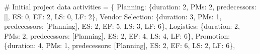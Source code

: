 \documentclass[
  letterpaper,
  DIV=11,
  numbers=noendperiod]{scrreprt}
\newenvironment{Shaded}{\begin{snugshade}}{\end{snugshade}}
\newcommand{\CommentTok}[1]{\textcolor[rgb]{0.37,0.37,0.37}{#1}}
\newcommand{\DecValTok}[1]{\textcolor[rgb]{0.68,0.00,0.00}{#1}}
\newcommand{\NormalTok}[1]{\textcolor[rgb]{0.00,0.23,0.31}{#1}}
\newcommand{\OperatorTok}[1]{\textcolor[rgb]{0.37,0.37,0.37}{#1}}
\newcommand{\StringTok}[1]{\textcolor[rgb]{0.13,0.47,0.30}{#1}}
\begin{document}
\begin{Shaded}
\begin{Highlighting}[]
    \CommentTok{\# Initial project data}
\NormalTok{    activities }\OperatorTok{=}\NormalTok{ \{}
        \StringTok{\textquotesingle{}Planning\textquotesingle{}}\NormalTok{: \{}\StringTok{\textquotesingle{}duration\textquotesingle{}}\NormalTok{: }\DecValTok{2}\NormalTok{, }\StringTok{\textquotesingle{}PMs\textquotesingle{}}\NormalTok{: }\DecValTok{2}\NormalTok{, }\StringTok{\textquotesingle{}predecessors\textquotesingle{}}\NormalTok{: [], }\StringTok{\textquotesingle{}ES\textquotesingle{}}\NormalTok{: }\DecValTok{0}\NormalTok{, }\StringTok{\textquotesingle{}EF\textquotesingle{}}\NormalTok{: }\DecValTok{2}\NormalTok{, }\StringTok{\textquotesingle{}LS\textquotesingle{}}\NormalTok{: }\DecValTok{0}\NormalTok{, }\StringTok{\textquotesingle{}LF\textquotesingle{}}\NormalTok{: }\DecValTok{2}\NormalTok{\},}
        \StringTok{\textquotesingle{}Vendor Selection\textquotesingle{}}\NormalTok{: \{}\StringTok{\textquotesingle{}duration\textquotesingle{}}\NormalTok{: }\DecValTok{3}\NormalTok{, }\StringTok{\textquotesingle{}PMs\textquotesingle{}}\NormalTok{: }\DecValTok{1}\NormalTok{, }\StringTok{\textquotesingle{}predecessors\textquotesingle{}}\NormalTok{: [}\StringTok{\textquotesingle{}Planning\textquotesingle{}}\NormalTok{], }\StringTok{\textquotesingle{}ES\textquotesingle{}}\NormalTok{: }\DecValTok{2}\NormalTok{, }\StringTok{\textquotesingle{}EF\textquotesingle{}}\NormalTok{: }\DecValTok{5}\NormalTok{, }\StringTok{\textquotesingle{}LS\textquotesingle{}}\NormalTok{: }\DecValTok{3}\NormalTok{, }\StringTok{\textquotesingle{}LF\textquotesingle{}}\NormalTok{: }\DecValTok{6}\NormalTok{\},}
        \StringTok{\textquotesingle{}Logistics\textquotesingle{}}\NormalTok{: \{}\StringTok{\textquotesingle{}duration\textquotesingle{}}\NormalTok{: }\DecValTok{2}\NormalTok{, }\StringTok{\textquotesingle{}PMs\textquotesingle{}}\NormalTok{: }\DecValTok{2}\NormalTok{, }\StringTok{\textquotesingle{}predecessors\textquotesingle{}}\NormalTok{: [}\StringTok{\textquotesingle{}Planning\textquotesingle{}}\NormalTok{], }\StringTok{\textquotesingle{}ES\textquotesingle{}}\NormalTok{: }\DecValTok{2}\NormalTok{, }\StringTok{\textquotesingle{}EF\textquotesingle{}}\NormalTok{: }\DecValTok{4}\NormalTok{, }\StringTok{\textquotesingle{}LS\textquotesingle{}}\NormalTok{: }\DecValTok{4}\NormalTok{, }\StringTok{\textquotesingle{}LF\textquotesingle{}}\NormalTok{: }\DecValTok{6}\NormalTok{\},}
        \StringTok{\textquotesingle{}Promotion\textquotesingle{}}\NormalTok{: \{}\StringTok{\textquotesingle{}duration\textquotesingle{}}\NormalTok{: }\DecValTok{4}\NormalTok{, }\StringTok{\textquotesingle{}PMs\textquotesingle{}}\NormalTok{: }\DecValTok{1}\NormalTok{, }\StringTok{\textquotesingle{}predecessors\textquotesingle{}}\NormalTok{: [}\StringTok{\textquotesingle{}Planning\textquotesingle{}}\NormalTok{], }\StringTok{\textquotesingle{}ES\textquotesingle{}}\NormalTok{: }\DecValTok{2}\NormalTok{, }\StringTok{\textquotesingle{}EF\textquotesingle{}}\NormalTok{: }\DecValTok{6}\NormalTok{, }\StringTok{\textquotesingle{}LS\textquotesingle{}}\NormalTok{: }\DecValTok{2}\NormalTok{, }\StringTok{\textquotesingle{}LF\textquotesingle{}}\NormalTok{: }\DecValTok{6}\NormalTok{\},}

\end{Highlighting}
\end{Shaded}
\end{document}
